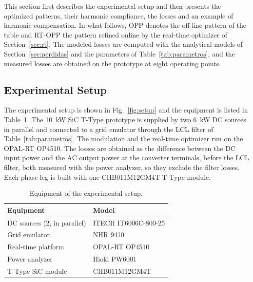 \documentclass[conference]{IEEEtran}
\newcommand{\old}[1]{\par\smallskip\noindent{\color{gray}\footnotesize
    \textbf{[ANTES]} #1}\par\smallskip}
\renewcommand{\old}[1]{}       %
\begin{document}
This section first describes the experimental setup and then presents the
optimized patterns, their harmonic compliance, the losses and an example of
harmonic compensation. In what follows, OPP denotes the off-line pattern
of the table and RT-OPP the pattern refined online by the real-time
optimizer of Section~\ref{sec:rt}. The modeled
losses are computed with the analytical models of
Section~\ref{sec:perdidas} and the parameters of Table~\ref{tab:parametros},
and the measured losses are obtained on the prototype at eight operating
points.
\old{El parrafo anterior describia el metodo (Julia, multi-start, LUT de
conferencia, PLECS, OPAL-RT); paso a la Seccion~\ref{sec:implementacion} y a
la Seccion~\ref{sec:rt}, y la frase de PLECS se quito.}



\subsection{Experimental Setup}
\label{subsec:setup}

The experimental setup is shown in Fig.~\ref{fig:setup} and the equipment is
listed in Table~\ref{tab:equipos}. The 10~kW SiC T-Type prototype is
supplied by two 6~kW DC sources in parallel and connected to a grid
emulator through the LCL filter of Table~\ref{tab:parametros}. The
modulation and the real-time optimizer run on the OPAL-RT OP4510. The
losses are obtained as the difference between the DC input power and the AC
output power at the converter terminals, before the LCL filter, both
measured with the power analyzer, so they exclude the filter losses. Each phase leg is built with one
CHB011M12GM4T T-Type module.


\begin{table}[!t]
    \centering
    \caption{Equipment of the experimental setup.}
    \bgroup
    \def\arraystretch{1.0}
    \setlength{\tabcolsep}{4pt}
    \begin{tabular*}{\columnwidth}{@{\extracolsep{\fill}}ll@{}}
        \toprule
        \rowcolor{Gray}
        Equipment & Model \\ \midrule
        DC sources (2, in parallel) & ITECH IT6006C-800-25 \\
        Grid emulator               & NHR 9410 \\
        Real-time platform          & OPAL-RT OP4510 \\
        Power analyzer              & Hioki PW6001 \\
        T-Type SiC module           & CHB011M12GM4T \\
        \bottomrule
    \end{tabular*}
    \egroup
    \label{tab:equipos}
\end{table}
\end{document}
